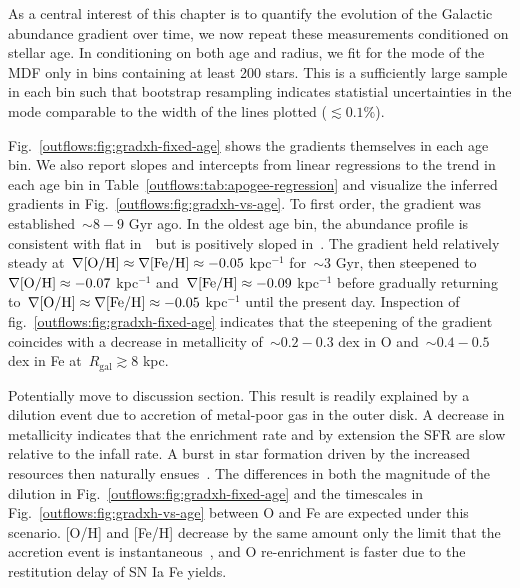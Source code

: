 As a central interest of this chapter is to quantify the evolution of the
Galactic abundance gradient over time, we now repeat these measurements
conditioned on stellar age.
In conditioning on both age and radius, we fit for the mode of the MDF only in
bins containing at least 200 stars.
This is a sufficiently large sample in each bin such that bootstrap resampling
indicates statistial uncertainties in the mode comparable to the width of the
lines plotted ($\lesssim0.1\%$).
\par
Fig.~\ref{outflows:fig:gradxh-fixed-age} shows the gradients themselves in each
age bin.
We also report slopes and intercepts from linear regressions to the trend in
each age bin in Table~\ref{outflows:tab:apogee-regression} and visualize the
inferred gradients in Fig.~\ref{outflows:fig:gradxh-vs-age}.
To first order, the gradient was established~$\sim$$8 - 9$ Gyr ago.
In the oldest age bin, the abundance profile is consistent with flat in~\oh~but
is positively sloped in~\feh.
The gradient held relatively steady at~$\nabla\text{[O/H]} \approx \nabla\text{[Fe/H]} \approx
-0.05$ kpc$^{-1}$ for~$\sim$3 Gyr, then steepened to~$\nabla\text{[O/H]} \approx -0.07$
kpc$^{-1}$ and~$\nabla\text{[Fe/H]} \approx -0.09$ kpc$^{-1}$ before gradually returning
to~$\nabla\text{[O/H]} \approx \nabla\text{[Fe/H]} \approx -0.05$ kpc$^{-1}$ until the present day.
Inspection of fig.~\ref{outflows:fig:gradxh-fixed-age} indicates that the
steepening of the gradient coincides with a decrease in metallicity
of~$\sim$$0.2 - 0.3$ dex in O and~$\sim$$0.4 - 0.5$ dex in Fe
at~$R_\text{gal} \gtrsim$8 kpc.
\par
{\color{red} Potentially move to discussion section.}
This result is readily explained by a dilution event due to accretion of
metal-poor gas in the outer disk.
A decrease in metallicity indicates that the enrichment rate and by extension
the SFR are slow relative to the infall rate.
A burst in star formation driven by the increased resources then naturally
ensues~\citep[e.g.,][]{Dalcanton2007}.
The differences in both the magnitude of the dilution in
Fig.~\ref{outflows:fig:gradxh-fixed-age} and the timescales in
Fig.~\ref{outflows:fig:gradxh-vs-age} between O and Fe are expected under this
scenario.
[O/H] and [Fe/H] decrease by the same amount only the limit that the
accretion event is instantaneous~\citep{Johnson2020}, and O re-enrichment is
faster due to the restitution delay of SN Ia Fe yields.

